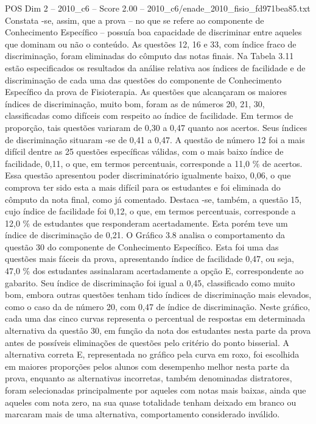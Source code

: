 \begin{textsample}{POS Dim 2 – 2010\_c6 – Score 2.00 – 2010\_c6/enade\_2010\_fisio\_fd971bea85.txt}
Constata -se, assim, que a prova – no que se refere ao componente de Conhecimento Específico – possuía boa capacidade de discriminar entre aqueles que dominam ou não o conteúdo.
As questões 12, 16 e 33, com índice fraco de discriminação, foram eliminadas do cômputo das notas finais.
Na Tabela 3.11 estão especificados os resultados da análise relativa aos índices de facilidade e de discriminação de cada uma das questões do componente de Conhecimento Específico da prova de Fisioterapia.
As questões que alcançaram os maiores índices de discriminação, muito bom, foram as de números 20, 21, 30, classificadas como difíceis com respeito ao índice de facilidade.
Em termos de proporção, tais questões variaram de 0,30 a 0,47 quanto aos acertos.
Seus índices de discriminação situaram -se de 0,41 a 0,47.
A questão de número 12 foi a mais difícil dentre as 25 questões específicas válidas, com o mais baixo índice de facilidade, 0,11, o que, em termos percentuais, corresponde a 11,0 \% de acertos.
Essa questão apresentou poder discriminatório igualmente baixo, 0,06, o que comprova ter sido esta a mais difícil para os estudantes e foi eliminada do cômputo da nota final, como já comentado.
Destaca -se, também, a questão 15, cujo índice de facilidade foi 0,12, o que, em termos percentuais, corresponde a 12,0 \% de estudantes que responderam acertadamente.
Esta porém teve um índice de discriminação de 0,21.
O Gráfico 3.8 analisa o comportamento da questão 30 do componente de Conhecimento Específico.
Esta foi uma das questões mais fáceis da prova, apresentando índice de facilidade 0,47, ou seja, 47,0 \% dos estudantes assinalaram acertadamente a opção E, correspondente ao gabarito.
Seu índice de discriminação foi igual a 0,45, classificado como muito bom, embora outras questões tenham tido índices de discriminação mais elevados, como o caso da de número 20, com 0,47 de índice de discriminação.
Neste gráfico, cada uma das cinco curvas representa o percentual de respostas em determinada alternativa da questão 30, em função da nota dos estudantes nesta parte da prova antes de possíveis eliminações de questões pelo critério do ponto bisserial.
A alternativa correta E, representada no gráfico pela curva em roxo, foi escolhida em maiores proporções pelos alunos com desempenho melhor nesta parte da prova, enquanto as alternativas incorretas, também denominadas distratores, foram selecionadas principalmente por aqueles com notas mais baixas, ainda que aqueles com nota zero, na sua quase totalidade tenham deixado em branco ou marcaram mais de uma alternativa, comportamento considerado inválido.

\end{textsample}
